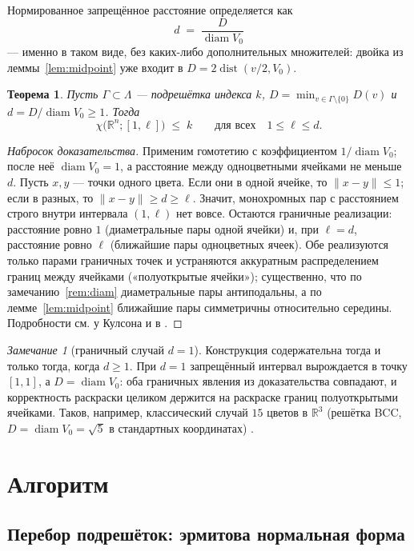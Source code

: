 \documentclass[12pt]{article}
\theoremstyle{plain}
\newtheorem{theorem}{Теорема}
\theoremstyle{definition}
\theoremstyle{remark}
\newtheorem{remark}{Замечание}
\newcommand{\RR}{\mathbb{R}}
\DeclareMathOperator{\diam}{diam}
\DeclareMathOperator{\dist}{dist}
\begin{document}
Нормированное запрещённое расстояние определяется как
\[
d \;=\; \frac{D}{\diam V_0}
\]
--- именно в таком виде, без каких-либо дополнительных множителей: двойка из
леммы~\ref{lem:midpoint} уже входит в $D=2\dist(v/2,V_0)$.

\begin{theorem}\label{thm:main}
Пусть $\Gamma\subset\Lambda$ --- подрешётка индекса $k$,
$D=\min_{v\in\Gamma\setminus\{0\}}D(v)$ и $d=D/\diam V_0\ge 1$. Тогда
\[
\chi\bigl(\RR^n;[1,\ell]\bigr)\;\le\;k
\qquad\text{для всех}\quad 1\le\ell\le d.
\]
\end{theorem}

\begin{proof}[Набросок доказательства]
Применим гомотетию с коэффициентом $1/\diam V_0$; после неё $\diam V_0=1$, а
расстояние между одноцветными ячейками не меньше $d$. Пусть $x,y$ --- точки
одного цвета. Если они в одной ячейке, то $\|x-y\|\le 1$; если в разных, то
$\|x-y\|\ge d\ge\ell$. Значит, монохромных пар с расстоянием строго внутри
интервала $(1,\ell)$ нет вовсе. Остаются граничные реализации: расстояние
ровно $1$ (диаметральные пары одной ячейки) и, при $\ell=d$, расстояние ровно
$\ell$ (ближайшие пары одноцветных ячеек). Обе реализуются только парами
граничных точек и устраняются аккуратным распределением границ между ячейками
(«полуоткрытые ячейки»); существенно, что по замечанию~\ref{rem:diam}
диаметральные пары антиподальны, а по лемме~\ref{lem:midpoint} ближайшие пары
симметричны относительно середины. Подробности см. у Кулсона
\cite{Coulson2002} и в \cite[Prop.~5]{Arman2021}.
\end{proof}

\begin{remark}[граничный случай $d=1$]
Конструкция содержательна тогда и только тогда, когда $d\ge 1$. При $d=1$
запрещённый интервал вырождается в точку $[1,1]$, а $D=\diam V_0$: оба
граничных явления из доказательства совпадают, и корректность раскраски
целиком держится на раскраске границ полуоткрытыми ячейками. Таков, например,
классический случай $15$ цветов в $\RR^3$ (решётка BCC, $D=\diam
V_0=\sqrt{5}$ в стандартных координатах) \cite{Coulson2002}.
\end{remark}

\section{Алгоритм}

\subsection{Перебор подрешёток: эрмитова нормальная форма}
\end{document}
